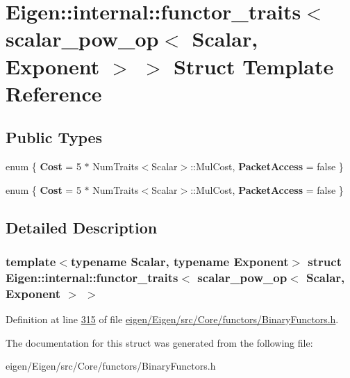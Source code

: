 \hypertarget{struct_eigen_1_1internal_1_1functor__traits_3_01scalar__pow__op_3_01_scalar_00_01_exponent_01_4_01_4}{}\section{Eigen\+:\+:internal\+:\+:functor\+\_\+traits$<$ scalar\+\_\+pow\+\_\+op$<$ Scalar, Exponent $>$ $>$ Struct Template Reference}
\label{struct_eigen_1_1internal_1_1functor__traits_3_01scalar__pow__op_3_01_scalar_00_01_exponent_01_4_01_4}
\subsection*{Public Types}
\begin{DoxyCompactItemize}
\item 
\mbox{\label{struct_eigen_1_1internal_1_1functor__traits_3_01scalar__pow__op_3_01_scalar_00_01_exponent_01_4_01_4_a7fca9d2e15d2328442fc56a966b6120a}} 
enum \{ {\bfseries Cost} = 5 $\ast$ Num\+Traits$<$Scalar$>$\+:\+:Mul\+Cost, 
{\bfseries Packet\+Access} = false
 \}
\item 
\mbox{\label{struct_eigen_1_1internal_1_1functor__traits_3_01scalar__pow__op_3_01_scalar_00_01_exponent_01_4_01_4_a30a67d569e1f51e003b4fd7094ef3031}} 
enum \{ {\bfseries Cost} = 5 $\ast$ Num\+Traits$<$Scalar$>$\+:\+:Mul\+Cost, 
{\bfseries Packet\+Access} = false
 \}
\end{DoxyCompactItemize}


\subsection{Detailed Description}
\subsubsection*{template$<$typename Scalar, typename Exponent$>$\newline
struct Eigen\+::internal\+::functor\+\_\+traits$<$ scalar\+\_\+pow\+\_\+op$<$ Scalar, Exponent $>$ $>$}



Definition at line \hyperlink{eigen_2_eigen_2src_2_core_2functors_2_binary_functors_8h_source_l00315}{315} of file \hyperlink{eigen_2_eigen_2src_2_core_2functors_2_binary_functors_8h_source}{eigen/\+Eigen/src/\+Core/functors/\+Binary\+Functors.\+h}.



The documentation for this struct was generated from the following file\+:\begin{DoxyCompactItemize}
\item 
eigen/\+Eigen/src/\+Core/functors/\+Binary\+Functors.\+h\end{DoxyCompactItemize}

